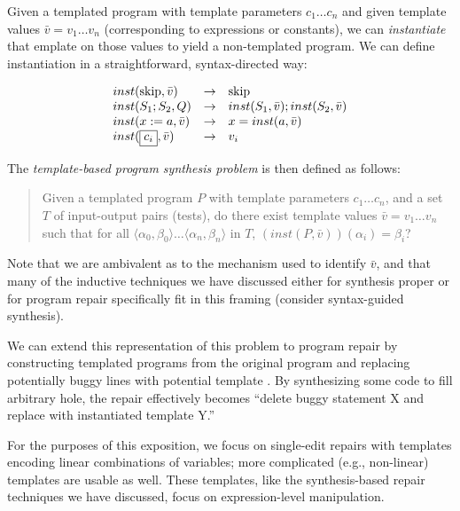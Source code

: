 \documentclass[11pt]{article}
\begin{document}
Given a templated program with template parameters $c_1 \ldots c_n$ and given
template values $\bar{v} = v_1 \ldots v_n$ (corresponding to expressions or
constants), we can \emph{instantiate} that emplate on those values to yield a
non-templated program.  We can define instantiation in a straightforward,
syntax-directed way:

\begin{center}
\[
\begin{array}{lcl}
inst(\mbox{skip}, \bar{v}) & \rightarrow & \mbox{skip} \\
inst(S_1; S_2, Q) & \rightarrow & inst(S_1, \bar{v}); inst(S_2, \bar{v}) \\
inst(x := a, \bar{v}) & \rightarrow & x = inst(a, \bar{v}) \\
inst(\fbox{$\displaystyle c_i $}, \bar{v}) & \rightarrow & v_i 
\end{array}
\]
\end{center}

The \emph{template-based program synthesis problem} is then defined as follows: 
\begin{quote}
  Given a templated program $P$ with template parameters $c_1\ldots c_n$, and a
  set $T$ of input-output pairs (tests), do there exist template values
  $\bar{v}=v_1 \ldots v_n$ such that for all
  ${ \langle \alpha_0, \beta_0 \rangle \ldots \langle \alpha_n, \beta_n \rangle }$ in $T$,
  $(inst(P,\bar{v}))(\alpha_i) = \beta_i$?
\end{quote}

Note that we are ambivalent as to the mechanism used to identify $\bar{v}$, and
that many of the inductive techniques we have discussed either for synthesis
proper or for program repair specifically fit in this framing (consider
syntax-guided synthesis). 

We can extend this representation of this problem to program repair by
constructing templated programs from the original program and replacing
potentially buggy lines with potential template . By
synthesizing some code to fill arbitrary hole, the repair effectively becomes
``delete buggy statement X and replace with instantiated template Y.'' 

For the purposes of this exposition, we focus on single-edit repairs with
templates encoding linear combinations of variables; more complicated (e.g.,
non-linear) templates are usable as well.  These templates, like the
synthesis-based repair techniques we have discussed, focus on expression-level
manipulation. 
\end{document}
